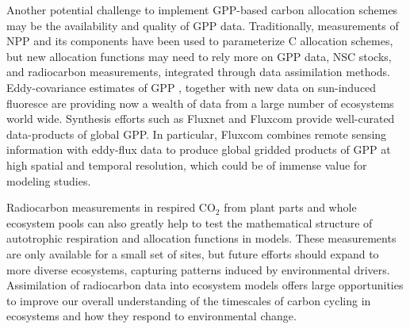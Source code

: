 \documentclass[bg, manuscript]{copernicus}
\begin{document}
Another potential challenge to implement GPP-based carbon allocation schemes may be the availability and quality of GPP data. Traditionally, measurements of NPP and its components have been used to parameterize C allocation schemes, but new allocation functions may need to rely more on GPP data, NSC stocks, and radiocarbon measurements, integrated through data assimilation methods. Eddy-covariance estimates of GPP \citep{Beer2010}, together with new data on sun-induced fluoresce \citep{Gu2019} are providing now a wealth of data from a large number of ecosystems world wide. Synthesis efforts such as Fluxnet \citep{Pastorello2020} and Fluxcom \citep{Jung2020} provide well-curated data-products of global GPP. In particular, Fluxcom combines remote sensing information with eddy-flux data to produce global gridded products of GPP at high spatial and temporal resolution, which could be of immense value for modeling studies. 

Radiocarbon measurements in respired CO$_2$ from plant parts and whole ecosystem pools can also greatly help to test the mathematical structure of autotrophic respiration and allocation functions in models. These measurements are only available for a small set of sites, but future efforts should expand to more diverse ecosystems, capturing patterns induced by environmental drivers.  Assimilation of radiocarbon data into ecosystem models offers large opportunities to improve our overall understanding of the timescales of carbon cycling in ecosystems and how they respond to environmental change. 








\end{document}
